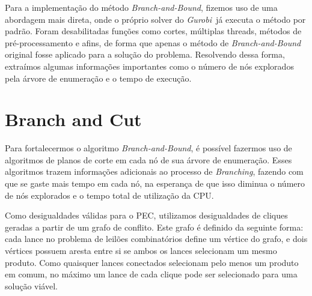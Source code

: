\documentclass{article}
\newenvironment{algoritmo}[1][]
  {\begin{algorithm}[#1]
     \selectlanguage{brazil}%
     \floatname{algorithm}{Algoritmo}%
  }
  {\end{algorithm}}
\begin{document}
	
	Para a implementação do método \emph{Branch-and-Bound}, fizemos uso de uma abordagem mais direta, onde o próprio solver do \emph{Gurobi}\,\cite{gurobi} já executa o método por padrão. Foram desabilitadas funções como cortes, múltiplas threads, métodos de pré-processamento e afins, de forma que apenas o método de \emph{Branch-and-Bound} original fosse aplicado para a solução do problema.
	Resolvendo dessa forma, extraímos algumas informações importantes como o número de nós explorados pela árvore de enumeração e o tempo de execução.
	
	
	
	\section{Branch and Cut}\label{sec:BC}
	Para fortalecermos o algoritmo \emph{Branch-and-Bound}, é possível fazermos uso de algoritmos de planos de corte em cada nó de sua árvore de enumeração.
	Esses algoritmos trazem informações adicionais ao processo de \emph{Branching},
	fazendo com que se gaste mais tempo em cada nó, na esperança de que isso diminua o número de nós explorados e o tempo total de utilização da CPU.
	
	Como desigualdades válidas para o PEC, utilizamos desigualdades de cliques geradas a partir de um grafo de conflito. Este grafo é definido da seguinte forma: cada lance no problema de leilões combinatórios define um vértice do grafo,
	e dois vértices possuem aresta entre si se ambos os lances selecionam um mesmo produto. Como quaisquer lances conectados selecionam pelo menos um produto em comum, no máximo um lance de cada clique pode ser selecionado para uma solução viável.
	

            
\end{document}
